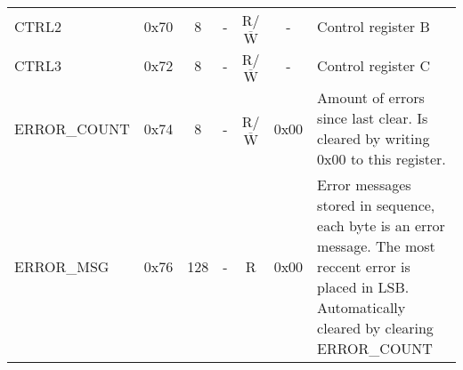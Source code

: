\begin{landscape}
\begin{center}
\begin{tabularx}{\linewidth}{l c c c c c X}
    CTRL2 & 0x70 & 8 & - & R/$\overline{\text{W}}$ & - & Control register B \vspace{\My_x} \\

    CTRL3 & 0x72 & 8 & - & R/$\overline{\text{W}}$ & - & Control register C \vspace{\My_x} \\

    ERROR\_COUNT & 0x74 & 8 & - & R/$\overline{\text{W}}$ & 0x00 & Amount of errors since last clear. Is cleared by writing 0x00 to this register. \vspace{\My_x} \\

    ERROR\_MSG & 0x76 & 128 & - & R & 0x00 & Error messages stored in sequence, each byte is an error message. The most reccent error is placed in LSB. Automatically cleared by clearing ERROR\_COUNT \vspace{\My_x} \\

    \hline

\end{tabularx}


\end{center}
\end{landscape}
\endgroup